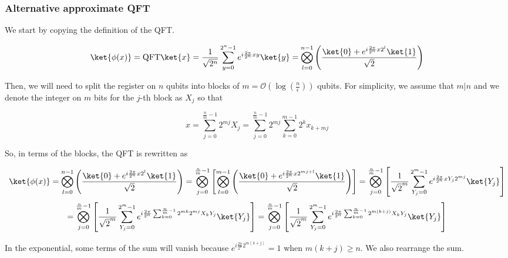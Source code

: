 \subsubsection{Alternative approximate QFT}
We start by copying the definition of the QFT.

\begin{equation*}
    \ket{\phi(x)} = \text{QFT}\ket{x} = \frac{1}{\sqrt{2^n}}\sum_{y=0}^{2^n-1}e^{i\frac{2\pi}{2^n}xy}\ket{y} = \bigotimes_{l=0}^{n-1}\left(\frac{\ket{0} + e^{i\frac{2\pi}{2^n}x2^l}\ket{1}}{\sqrt{2}}\right)
\end{equation*}

Then, we will need to split the register on $n$ qubits into blocks of $m = \mathcal{O}\left(\log\left(\frac{n}{\epsilon}\right)\right)$ qubits. For simplicity, we assume that $m|n$ and we denote the integer on $m$ bits for the $j$-th block as $X_j$ so that

\begin{equation}
    x = \sum_{j=0}^{\frac{n}{m}-1}2^{mj}X_j = \sum_{j=0}^{\frac{n}{m}-1}2^{mj}\sum_{k=0}^{m-1}2^kx_{k+mj}
    \label{block}
\end{equation}

So, in terms of the blocks, the QFT is rewritten as 

\begin{equation*}
    \ket{\phi(x)} = \bigotimes_{l=0}^{n-1}\left(\frac{\ket{0} + e^{i\frac{2\pi}{2^n}x2^l}\ket{1}}{\sqrt{2}}\right) = \bigotimes_{j=0}^{\frac{n}{m}-1}\left[\bigotimes_{l=0}^{m-1}\left(\frac{\ket{0} + e^{i\frac{2\pi}{2^n}x 2^{mj+l}}\ket{1}}{\sqrt{2}}\right)\right] = \bigotimes_{j=0}^{\frac{n}{m}-1} \left[\frac{1}{\sqrt{2}^m}\sum_{Y_j=0}^{2^m-1}e^{i\frac{2\pi}{2^n}x Y_j 2^{mj}}\ket{Y_j}\right]
\end{equation*}
\begin{equation*}
    = \bigotimes_{j=0}^{\frac{n}{m}-1} \left[\frac{1}{\sqrt{2}^m}\sum_{Y_j=0}^{2^m-1}e^{i\frac{2\pi}{2^n}\sum_{k=0}^{\frac{n}{m}-1}2^{mk} 2^{mj}X_kY_j}\ket{Y_j}\right] = \bigotimes_{j=0}^{\frac{n}{m}-1} \left[\frac{1}{\sqrt{2}^m}\sum_{Y_j=0}^{2^m-1}e^{i\frac{2\pi}{2^n}\sum_{k=0}^{\frac{n}{m}-1}2^{m(k+j)}X_kY_j}\ket{Y_j}\right]
\end{equation*}

In the exponential, some terms of the sum will vanish because $e^{i\frac{2\pi}{2^n}2^{m(k+j)}} = 1$ when $m(k+j) \geq n$. We also rearrange the sum.

